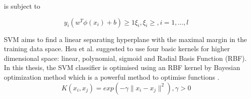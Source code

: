 is subject to

\begin{equation}
y_i(w^T  \phi(x_i) + b) \geq 1 \xi_{i},  \xi_{i} \geq, i = 1,... ,l 
\end{equation} 
\newpage

SVM aims to find a linear separating hyperplane with the maximal margin in the training data space. Hsu et al. suggested to use four basic kernels for higher dimensional space: linear, polynomial, sigmoid and Radial Basis Function (RBF).
 In this thesis, the SVM classifier is optimised using an RBF kernel by Bayesian optimization method which is a powerful method to optimise functions \citep{mockus2012bayesian}. 
\begin{equation}
K(x_i, x_j)  = exp(-\gamma  \parallel x_i - x_j \parallel ^ 2),\gamma > 0
\end{equation}
 

